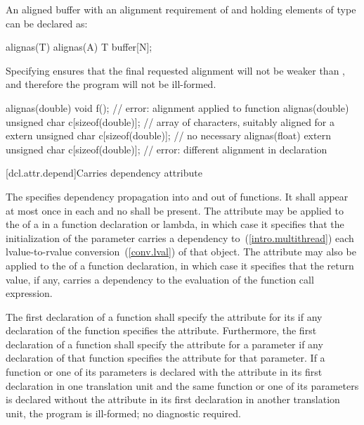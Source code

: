 \pnum
\enterexample An aligned buffer with an alignment requirement
of  and holding  elements of type 
can be declared as:

\begin{codeblock}
alignas(T) alignas(A) T buffer[N];
\end{codeblock}
Specifying  ensures
that the final requested alignment will not be weaker than ,
and therefore the program will not be ill-formed.
\exitexample

\pnum
\enterexample
\begin{codeblock}
alignas(double) void f();                         // error: alignment applied to function
alignas(double) unsigned char c[sizeof(double)];  // array of characters, suitably aligned for a 
extern unsigned char c[sizeof(double)];           // no  necessary
alignas(float)
  extern unsigned char c[sizeof(double)];         // error: different alignment in declaration
\end{codeblock}
\exitexample

[dcl.attr.depend]{Carries dependency attribute}%

\pnum
The   specifies
dependency propagation into and out of functions. It shall appear at most once
in each  and no
 shall be present. The attribute may be
applied to the  of a
 in a function declaration or lambda, in
which case it specifies that the initialization of the parameter carries a
dependency to~(\ref{intro.multithread}) each lvalue-to-rvalue
conversion~(\ref{conv.lval}) of that object. The attribute may also be applied
to the  of a function declaration, in which case it
specifies that the return value, if any, carries a dependency to the evaluation
of the function call expression.

\pnum
The first declaration of a function shall specify the  attribute for its
 if any declaration of the function specifies the
 attribute. Furthermore, the first declaration of a function shall specify
the  attribute for a parameter if any declaration of that function
specifies the  attribute for that parameter. If a function or one of its
parameters is declared with the  attribute in its first declaration in one
translation unit and the same function or one of its parameters is declared without the
 attribute in its first declaration in another translation unit, the
program is ill-formed; no diagnostic required.

